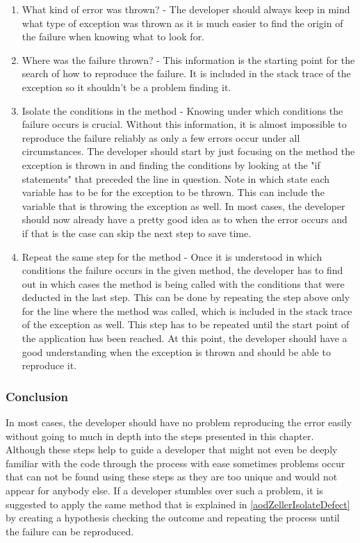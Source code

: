 \begin{enumerate}
  \item What kind of error was thrown? - The developer should always keep in mind what type of exception was thrown as it is much easier to find the origin of the failure when knowing what to look for.
  \item Where was the failure thrown? - This information is the starting point for the search of how to reproduce the failure. It is included in the stack trace of the exception so it shouldn't be a problem finding it.
  \item Isolate the conditions in the method - Knowing under which conditions the failure occurs is crucial. Without this information, it is almost impossible to reproduce the failure reliably as only a few errors occur under all circumstances. The developer should start by just focusing on the method the exception is thrown in and finding the conditions by looking at the "if statements" that preceded the line in question. Note in which state each variable has to be for the exception to be thrown. This can include the variable that is throwing the exception as well. In most cases, the developer should now already have a pretty good idea as to when the error occurs and if that is the case can skip the next step to save time.
  \item Repeat the same step for the method - Once it is understood in which conditions the failure occurs in the given method, the developer has to find out in which cases the method is being called with the conditions that were deducted in the last step. This can be done by repeating the step above only for the line where the method was called, which is included in the stack trace of the exception as well. This step has to be repeated until the start point of the application has been reached. At this point, the developer should have a good understanding when the exception is thrown and should be able to reproduce it.
\end{enumerate}

\subsubsection{Conclusion}
In most cases, the developer should have no problem reproducing the error easily without going to much in depth into the steps presented in this chapter. Although these steps help to guide a developer that might not even be deeply familiar with the code through the process with ease sometimes problems occur that can not be found using these steps as they are too unique and would not appear for anybody else. If a developer stumbles over such a problem, it is suggested to apply the same method that is explained in \ref{aodZellerIsolateDefect} by creating a hypothesis checking the outcome and repeating the process until the failure can be reproduced.


